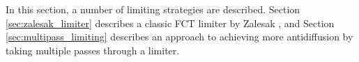 In this section, a number of limiting strategies are described.
Section \ref{sec:zalesak_limiter} describes a classic FCT limiter
by Zalesak \cite{zalesak}, and Section \ref{sec:multipass_limiting}
describes an approach to achieving more antidiffusion by taking
multiple passes through a limiter.
